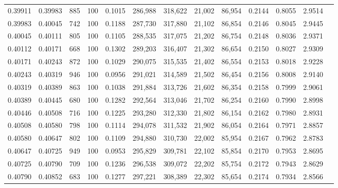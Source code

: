 \begin{tabular}{rrrrrrrrrrrrr}
0.39911 & 0.39983 &   885 & 100 &                                     0.1015 & 286,988 & 318,622 &  21,002 &  86,954 & 0.2144 & 0.8055 & 2.9514 \\
0.39983 & 0.40045 &   742 & 100 &                                     0.1188 & 287,730 & 317,880 &  21,102 &  86,854 & 0.2146 & 0.8045 & 2.9445 \\
0.40045 & 0.40111 &   805 & 100 &                                     0.1105 & 288,535 & 317,075 &  21,202 &  86,754 & 0.2148 & 0.8036 & 2.9371 \\
0.40112 & 0.40171 &   668 & 100 &                                     0.1302 & 289,203 & 316,407 &  21,302 &  86,654 & 0.2150 & 0.8027 & 2.9309 \\
0.40171 & 0.40243 &   872 & 100 &                                     0.1029 & 290,075 & 315,535 &  21,402 &  86,554 & 0.2153 & 0.8018 & 2.9228 \\
0.40243 & 0.40319 &   946 & 100 &                                     0.0956 & 291,021 & 314,589 &  21,502 &  86,454 & 0.2156 & 0.8008 & 2.9140 \\
0.40319 & 0.40389 &   863 & 100 &                                     0.1038 & 291,884 & 313,726 &  21,602 &  86,354 & 0.2158 & 0.7999 & 2.9061 \\
0.40389 & 0.40445 &   680 & 100 &                                     0.1282 & 292,564 & 313,046 &  21,702 &  86,254 & 0.2160 & 0.7990 & 2.8998 \\
0.40446 & 0.40508 &   716 & 100 &                                     0.1225 & 293,280 & 312,330 &  21,802 &  86,154 & 0.2162 & 0.7980 & 2.8931 \\
0.40508 & 0.40580 &   798 & 100 &                                     0.1114 & 294,078 & 311,532 &  21,902 &  86,054 & 0.2164 & 0.7971 & 2.8857 \\
0.40580 & 0.40647 &   802 & 100 &                                     0.1109 & 294,880 & 310,730 &  22,002 &  85,954 & 0.2167 & 0.7962 & 2.8783 \\
0.40647 & 0.40725 &   949 & 100 &                                     0.0953 & 295,829 & 309,781 &  22,102 &  85,854 & 0.2170 & 0.7953 & 2.8695 \\
0.40725 & 0.40790 &   709 & 100 &                                     0.1236 & 296,538 & 309,072 &  22,202 &  85,754 & 0.2172 & 0.7943 & 2.8629 \\
0.40790 & 0.40852 &   683 & 100 &                                     0.1277 & 297,221 & 308,389 &  22,302 &  85,654 & 0.2174 & 0.7934 & 2.8566 \\

\end{tabular}
